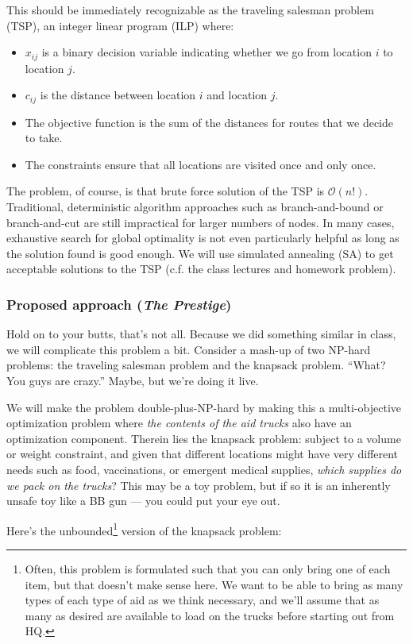 \documentclass{article} %
\begin{document}
This should be immediately recognizable as the traveling salesman problem (TSP), an integer linear program (ILP) where:

\begin{itemize}
  \item $x_{ij}$ is a binary decision variable indicating whether we go from location $i$ to location $j$.
  \item $c_{ij}$ is the distance between location $i$ and location $j$.
  \item The objective function is the sum of the distances for routes that we decide to take.
  \item The constraints ensure that all locations are visited once and only once.
\end{itemize}

The problem, of course, is that brute force solution of the TSP is $\mathcal{O}$$(n!)$. Traditional, deterministic
algorithm approaches such as branch-and-bound or branch-and-cut are still impractical for larger numbers of nodes.
In many cases, exhaustive search for global optimality is not even particularly helpful as long as the solution
found is good enough. We will use simulated annealing (SA) to get acceptable solutions to the TSP (c.f. the class lectures
and homework problem). 

\subsubsection*{Proposed approach (\emph{The Prestige})}

Hold on to your butts, that's not all. Because we did something similar in class, we will complicate
this problem a bit. Consider a mash-up of two NP-hard problems: the traveling salesman problem and the
knapsack problem. ``What? You guys are crazy.'' Maybe, but we're doing it live.

We will make the problem double-plus-NP-hard by making this a multi-objective optimization problem
where \emph{the contents of the aid trucks} also have an optimization component. Therein lies
the knapsack problem: subject to a volume or weight constraint, and given that different locations
might have very different needs such as food, vaccinations, or emergent medical supplies, \emph{which
supplies do we pack on the trucks}?  This may be a toy problem, but if so it is an inherently unsafe
toy like a BB gun --- you could put your eye out.

Here's the unbounded\footnote{Often, this problem is formulated such that you can only bring one of
each item, but that doesn't make sense here. We want to be able to bring as many types of each type
of aid as we think necessary, and we'll assume that as many as desired are available to load on the
trucks before starting out from HQ.} version of the knapsack problem:
\end{document}
